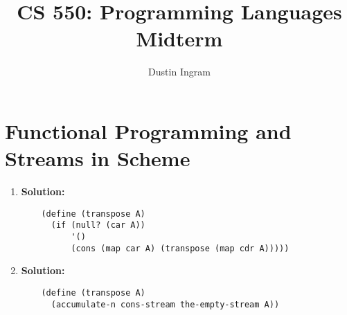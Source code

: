 \documentclass{article}
\title{CS 550: Programming Languages \\ Midterm}
\author{Dustin Ingram}
\begin{document}
\maketitle
\section{Functional Programming and Streams in Scheme}
\begin{enumerate}
    \item \textbf{Solution:}
    \begin{verbatim}
    (define (transpose A)
      (if (null? (car A))
          '()
          (cons (map car A) (transpose (map cdr A)))))
    \end{verbatim}
    \vspace{-1em}
    \item \textbf{Solution:}
    \begin{verbatim}
    (define (transpose A)
      (accumulate-n cons-stream the-empty-stream A))
    \end{verbatim}
    \vspace{-1em}
\end{enumerate}
\end{document}
